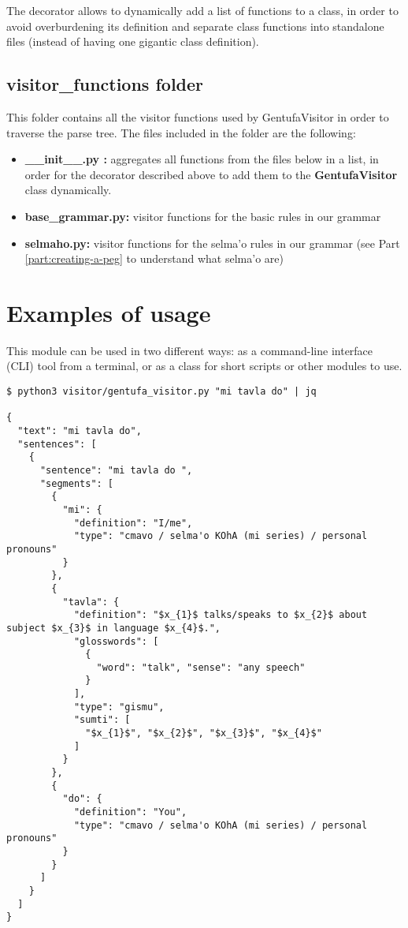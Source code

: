 The decorator allows to dynamically add a list of functions to a class, in order to avoid overburdening
its definition and separate class functions into standalone files (instead of having one gigantic class definition).

\subsection*{visitor\_functions folder}

This folder contains all the visitor functions used by GentufaVisitor in order to traverse the parse tree. The files included
in the folder are the following:

\begin{itemize}
  \item \textbf{\_\_init\_\_.py :} aggregates all functions from the files below in a list, in order for the decorator described above
  to add them to the \textbf{GentufaVisitor} class dynamically.
  \item \textbf{base\_grammar.py:} visitor functions for the basic rules in our grammar
  \item \textbf{selmaho.py:} visitor functions for the selma'o rules in our grammar (see Part \ref{part:creating-a-peg}
  to understand what selma'o are)
\end{itemize}

\newpage

\section{Examples of usage}

This module can be used in two different ways: as a command-line interface (CLI) tool
from a terminal, or as a class for short scripts or other modules to use.

\begin{lstlisting}[caption=GentufaVisitor module being used as a command-line interface tool]
$ python3 visitor/gentufa_visitor.py "mi tavla do" | jq

{
  "text": "mi tavla do",
  "sentences": [
    {
      "sentence": "mi tavla do ",
      "segments": [
        {
          "mi": {
            "definition": "I/me",
            "type": "cmavo / selma'o KOhA (mi series) / personal pronouns"
          }
        },
        {
          "tavla": {
            "definition": "$x_{1}$ talks/speaks to $x_{2}$ about subject $x_{3}$ in language $x_{4}$.",
            "glosswords": [
              {
                "word": "talk", "sense": "any speech"
              }
            ],
            "type": "gismu",
            "sumti": [
              "$x_{1}$", "$x_{2}$", "$x_{3}$", "$x_{4}$"
            ]
          }
        },
        {
          "do": {
            "definition": "You",
            "type": "cmavo / selma'o KOhA (mi series) / personal pronouns"
          }
        }
      ]
    }
  ]
}
\end{lstlisting}

